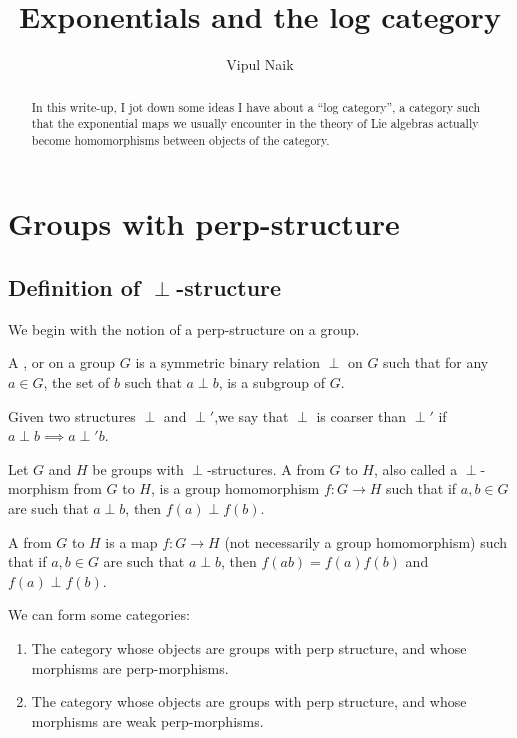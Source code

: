 \documentclass[a4paper]{amsart}
\title{Exponentials and the log category}
\author{Vipul Naik}
\begin{document}
\maketitle

\begin{abstract}
  In this write-up, I jot down some ideas I have about a ``log
  category'', a category such that the exponential maps we usually
  encounter in the theory of Lie algebras actually become
  homomorphisms between objects of the category. 
\end{abstract}

\section{Groups with perp-structure}

\subsection{Definition of  $\perp$-structure}

We begin with the notion of a perp-structure on a group.

\begin{definer}
  A , or  on
  a group $G$ is a symmetric binary relation $\perp$ on $G$ such that for any
  $a \in G$, the set of $b$ such that $a \perp b$, is a subgroup of $G$.
\end{definer}

Given two structures $\perp$ and $\perp'$,we say that $\perp$ is coarser
than $\perp'$ if $a \perp b \implies a \perp' b$.

\begin{definer}
  Let $G$ and $H$ be groups with $\perp$-structures. A
   from $G$ to $H$, also called a
  $\perp$-morphism from $G$ to $H$, is a group homomorphism $f: G \to
  H$ such that if $a, b \in G$ are such that $a \perp b$, then $f(a)
  \perp f(b)$.

  A  from $G$ to $H$ is a map $f: G \to
  H$ (not necessarily a group homomorphism) such that if $a, b \in G$
  are such that $a \perp b$, then $f(ab) = f(a)f(b)$ and $f(a) \perp f(b)$.
\end{definer}

We can form some categories:

\begin{enumerate}

\item The category whose objects are groups with perp structure, and
  whose morphisms are perp-morphisms.

\item The category whose objects are groups with perp structure, and
  whose morphisms are weak perp-morphisms.

\end{enumerate}
\end{document}
